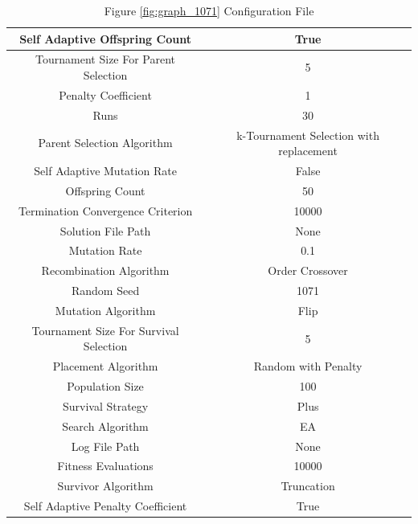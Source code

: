 \documentclass{standalone}
\begin{document}
\clearpage
\begin{table}[!htb]
	\centering
	\caption{Figure \ref{fig:graph_1071} Configuration File}
	\label{tab:graph_1071}
	\begin{tabular}{| c | c |}
		\hline
		Self Adaptive Offspring Count		& True		 \\
		\hline
		Tournament Size For Parent Selection		& 5		 \\
		\hline
		Penalty Coefficient		& 1		 \\
		\hline
		Runs		& 30		 \\
		\hline
		Parent Selection Algorithm		& k-Tournament Selection with replacement		 \\
		\hline
		Self Adaptive Mutation Rate		& False		 \\
		\hline
		Offspring Count		& 50		 \\
		\hline
		Termination Convergence Criterion		& 10000		 \\
		\hline
		Solution File Path		& None		 \\
		\hline
		Mutation Rate		& 0.1		 \\
		\hline
		Recombination Algorithm		& Order Crossover		 \\
		\hline
		Random Seed		& 1071		 \\
		\hline
		Mutation Algorithm		& Flip		 \\
		\hline
		Tournament Size For Survival Selection		& 5		 \\
		\hline
		Placement Algorithm		& Random with Penalty		 \\
		\hline
		Population Size		& 100		 \\
		\hline
		Survival Strategy		& Plus		 \\
		\hline
		Search Algorithm		& EA		 \\
		\hline
		Log File Path		& None		 \\
		\hline
		Fitness Evaluations		& 10000		 \\
		\hline
		Survivor Algorithm		& Truncation		 \\
		\hline
		Self Adaptive Penalty Coefficient		& True		 \\
		\hline
	\end{tabular}
\end{table}
\end{document}

